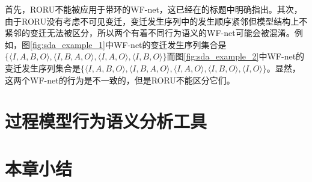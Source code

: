 首先，RORU不能被应用于带环的WF-net，这已经在的标题中明确指出。其次，由于RORU没有考虑不可见变迁，变迁发生序列中的发生顺序紧邻但模型结构上不紧邻的变迁无法被区分，所以两个有着不同行为语义的WF-net可能会被混淆。例如，图\ref{fig:sda_example_1}中WF-net的变迁发生序列集合是$\{\langle I,A,B,O\rangle,\langle I,B,A,O\rangle,\langle I,A,O\rangle,\langle I,B,O\rangle\}$而图\ref{fig:sda_example_2}中WF-net的变迁发生序列集合是$\{\langle I,A,B,O\rangle,\langle I,B,A,O\rangle,\langle I,A,O\rangle,\langle I,B,O\rangle,\langle I,O\rangle\}$。显然，这两个WF-net的行为是不一致的，但是RORU不能区分它们。

\section{过程模型行为语义分析工具}\label{sec:related_tools}

\section{本章小结}